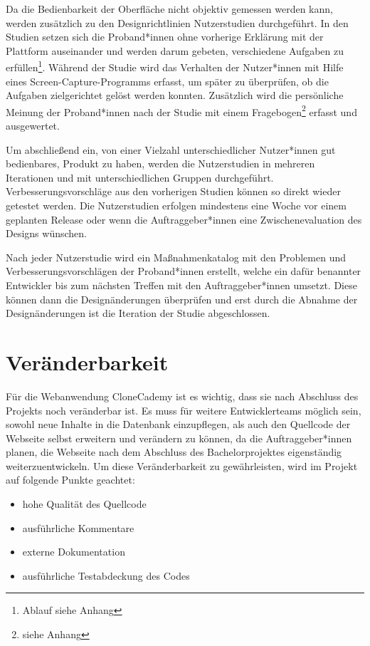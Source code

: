 \documentclass[accentcolor=tud0b,12pt,paper=a4]{tudreport}
\begin{document}
Da die Bedienbarkeit der Oberfläche nicht objektiv gemessen werden kann, werden zusätzlich zu den Designrichtlinien Nutzerstudien durchgeführt. In den Studien setzen sich die Proband*innen ohne vorherige Erklärung mit der Plattform auseinander und werden darum gebeten, verschiedene Aufgaben zu erfüllen\footnote{Ablauf siehe Anhang}. Während der Studie wird das Verhalten der Nutzer*innen mit Hilfe eines Screen-Capture-Programms erfasst, um später zu überprüfen, ob die Aufgaben zielgerichtet gelöst werden konnten. Zusätzlich wird die persönliche Meinung der Proband*innen nach der Studie mit einem Fragebogen\footnote{siehe Anhang} erfasst und ausgewertet.

Um abschließend ein, von einer Vielzahl unterschiedlicher Nutzer*innen gut bedienbares, Produkt zu haben, werden die Nutzerstudien in mehreren Iterationen und mit unterschiedlichen Gruppen durchgeführt. Verbesserungsvorschläge aus den vorherigen Studien können so direkt wieder getestet werden. Die Nutzerstudien erfolgen mindestens eine Woche vor einem geplanten Release oder wenn die Auftraggeber*innen eine Zwischenevaluation des Designs wünschen.

Nach jeder Nutzerstudie wird ein Maßnahmenkatalog mit den Problemen und Verbesserungsvorschlägen der Proband*innen erstellt, welche ein dafür benannter Entwickler bis zum nächsten Treffen mit den Auftraggeber*innen umsetzt. Diese können dann die Designänderungen überprüfen und erst durch die Abnahme der Designänderungen ist die Iteration der Studie abgeschlossen.


\section{Veränderbarkeit}
Für die Webanwendung CloneCademy ist es wichtig, dass sie nach Abschluss des Projekts noch veränderbar ist. Es muss für weitere Entwicklerteams möglich sein, sowohl neue Inhalte in die Datenbank einzupflegen, als auch den Quellcode der Webseite selbst erweitern und verändern zu können, da die Auftraggeber*innen planen, die Webseite nach dem Abschluss des Bachelorprojektes eigenständig weiterzuentwickeln.
\pagebreak
Um diese Veränderbarkeit zu gewährleisten, wird im Projekt auf folgende Punkte geachtet:
\begin{itemize}
	\item hohe Qualität des Quellcode
	\item ausführliche Kommentare
	\item externe Dokumentation
	\item ausführliche Testabdeckung des Codes
\end{itemize}
\end{document}
